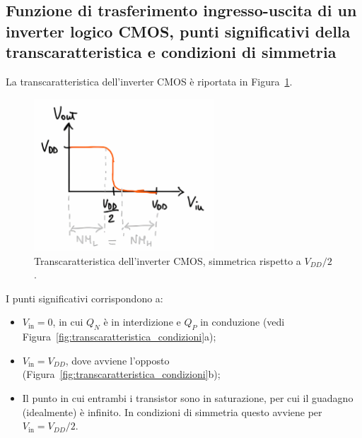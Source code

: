 \newpage
\subsection{Funzione di trasferimento ingresso-uscita di un inverter logico CMOS, punti significativi della transcaratteristica e condizioni di simmetria}

La transcaratteristica dell'inverter CMOS è riportata in Figura~\ref{fig:transcaratteristica}.\\[2mm]
\begin{figure}[H]
    \centering
    \includegraphics[width=0.6\textwidth]{images/2.1.3.1.png}
    \caption{Transcaratteristica dell'inverter CMOS, simmetrica rispetto a \(V_{DD}/2\).}
    \label{fig:transcaratteristica}
\end{figure}

I punti significativi corrispondono a:
\begin{itemize}
    \item \(V_{\text{in}} = 0\), in cui \(Q_N\) è in interdizione e \(Q_P\) in conduzione (vedi Figura~\ref{fig:transcaratteristica_condizioni}a);
    \item \(V_{\text{in}} = V_{DD}\), dove avviene l'opposto (Figura~\ref{fig:transcaratteristica_condizioni}b);
    \item Il punto in cui entrambi i transistor sono in saturazione, per cui il guadagno (idealmente) è infinito. In condizioni di simmetria questo avviene per \(V_{\text{in}} = V_{DD}/2\).
\end{itemize}


